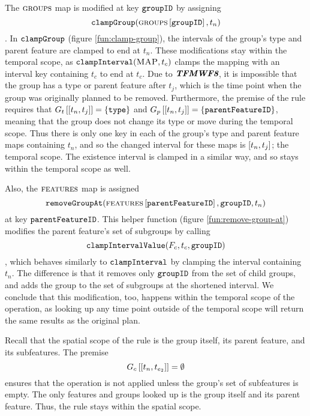    The $\textsc{groups}{}{}$ map is modified at key $\texttt{groupID}$ by assigning 
   $$\texttt{clampGroup}(\textsc{groups}{} \left[ \texttt{groupID} \right], t_n)$$
   . In $\texttt{clampGroup}$ (figure \vref{fun:clamp-group}), the intervals of the group's type and parent feature are clamped to end at $t_n$. These modifications stay within the temporal scope, as $\texttt{clampInterval}(\textsc{MAP}, t_c)$ clamps the mapping with an interval key containing $t_c$ to end at $t_c$. Due to $\textit{\textbf{TFMWF8}}$, it is impossible that the group has a type or parent feature after $t_j$, which is the time point when the group was originally planned to be removed. Furthermore, the premise of the rule requires that $\lookup{G_t}{\interval{t_n}{t_j}} = \set{\var{type}}$ and $\lookup{G_p}{\interval{t_n}{t_j}} = \set{\var{parentFeatureID}}$, meaning that the group does not change its type or move during the temporal scope. Thus there is only one key in each of the group's type and parent feature maps containing $t_n$, and so the changed interval for these maps is $\interval{t_n}{t_j}$; the temporal scope. The existence interval is clamped in a similar way, and so stays within the temporal scope as well.

   Also, the $\textsc{features}{}$ map is assigned $$\texttt{removeGroupAt}(\textsc{features} \left[ \texttt{parentFeatureID} \right], \texttt{groupID}, t_n)$$ at key $\texttt{parentFeatureID}$. This helper function (figure \vref{fun:remove-group-at}) modifies the parent feature's set of subgroups by calling $$\texttt{clampIntervalValue}(F_c, t_c, \texttt{groupID})$$, which behaves similarly to $\texttt{clampInterval}$ by clamping the interval containing $t_n$. The difference is that it removes only $\texttt{groupID}$ from the set of child groups, and adds the group to the set of subgroups at the shortened interval. We conclude that this modification, too, happens within the temporal scope of the operation, as looking up any time point outside of the temporal scope will return the same results as the original plan.

   Recall that the spatial scope of the rule is the group itself, its parent feature, and its subfeatures. The premise
\begin{equation*}
   \lookup{G_c}{\interval{t_n}{t_{e_2}}} = \emptyset
\end{equation*}
   ensures that the operation is not applied unless the group's set of subfeatures is empty. The only features and groups looked up is the group itself and its parent feature. Thus, the rule stays within the spatial scope.
 \\

